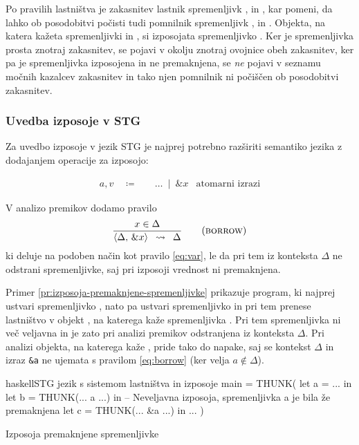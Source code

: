 Po pravilih lastništva je zakasnitev  lastnik spremenljivk ,  in , kar pomeni, da lahko ob posodobitvi počisti tudi pomnilnik spremenljivk ,  in . Objekta, na katera kažeta spremenljivki  in , si izposojata spremenljivko . Ker je spremenljivka  prosta znotraj zakasnitev, se pojavi v okolju znotraj ovojnice obeh zakasnitev, ker pa je spremenljivka izposojena in ne premaknjena, se \emph{ne} pojavi v seznamu močnih kazalcev zakasnitev in tako njen pomnilnik ni počiščen ob posodobitvi zakasnitev.

\subsubsection{Uvedba izposoje v STG}

Za uvedbo izposoje v jezik STG je najprej potrebno razširiti semantiko jezika z dodajanjem operacije za izposojo:

\begin{align*}
	a, v \quad \coloneq& \quad \dots \enspace \vert \enspace \& x & \text{atomarni izrazi}
\end{align*}

V analizo premikov dodamo pravilo
\begin{equation}
\infers[borrow]{
    x \in \Delta
}{
    \langle \Delta, \, \& x \rangle
}{
	\Delta
}
\label{eq:borrow}
\end{equation}
ki deluje na podoben način kot pravilo \ref{eq:var}, le da pri tem iz konteksta $\Delta$ ne odstrani spremenljivke, saj pri izposoji vrednost ni premaknjena.

Primer \ref{pr:izposoja-premaknjene-spremenljivke} prikazuje program, ki najprej ustvari spremenljivko , nato pa ustvari spremenljivko  in pri tem prenese lastništvo v objekt , na katerega kaže spremenljivka . Pri tem spremenljivka  ni več veljavna in je zato pri analizi premikov odstranjena iz konteksta $\Delta$. Pri analizi objekta, na katerega kaže , pride tako do napake, saj se kontekst $\Delta$ in izraz \texttt{\&a} ne ujemata s pravilom \ref{eq:borrow} (ker velja $a \notin \Delta$).

\begin{primer}[ht]
\centering
\begin{code-box}{haskell}{STG jezik s sistemom lastništva in izposoje \xmark}
main = THUNK(
    let a = ... in
    let b = THUNK(... a ...) in
    -- Neveljavna izposoja, spremenljivka a je bila že premaknjena
    let c = THUNK(... &a ...) in 
        ...
)
\end{code-box}
\caption{Izposoja premaknjene spremenljivke}
\label{pr:izposoja-premaknjene-spremenljivke}
\end{primer}

